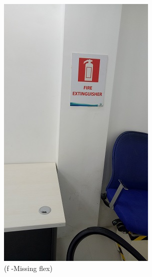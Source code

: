 \begin{figure}
\begin{minipage}[b]{0.22\linewidth}
	\includegraphics[width=\textwidth]{figures/R1P_safety/missing_fex.jpg}
	\caption*{(f -Missing flex)}
\end{minipage}
	\hspace{0.05cm}
\begin{minipage}[b]{0.22\linewidth}
	\centering

\end{minipage}
\end{figure}
